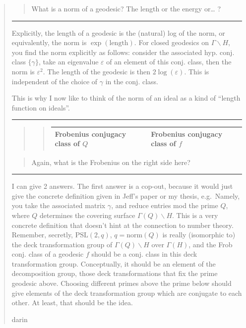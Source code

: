 \documentclass{article}
\begin{document}
\begin{quote}
\begin{quote}
What is a norm of a geodesic? The length or the energy or\ldots{} ?
\end{quote}

\begin{center}\rule{0.5\linewidth}{0.5pt}\end{center}

Explicitly, the length of a geodesic is the (natural) log of the norm,
or equivalently, the norm is \(\exp(\text{length})\). For closed
geodesics on \(\Gamma\backslash H\), you find the norm explicitly as
follows: consider the associated hyp. conj. class \(\{\gamma\}\), take
an eigenvalue \(\varepsilon\) of an element of this conj. class, then
the norm is \(\varepsilon^2\). The length of the geodesic is then
\(2\log(\varepsilon)\). This is independent of the choice of \(\gamma\)
in the conj. class.

This is why I now like to think of the norm of an ideal as a kind of
``length function on ideals''.

\begin{center}\rule{0.5\linewidth}{0.5pt}\end{center}

\begin{quote}
\begin{quote}
\begin{longtable}[]{@{}ll@{}}
\toprule
\endhead
Frobenius conjugacy class of \(Q\) & Frobenius conjugacy class of
\(f\)\tabularnewline
\bottomrule
\end{longtable}
\end{quote}
\end{quote}

\begin{quote}
Again, what is the Frobenius on the right side here?
\end{quote}

\begin{center}\rule{0.5\linewidth}{0.5pt}\end{center}

I can give 2 answers. The first answer is a cop-out, because it would
just give the concrete definition given in Jeff's paper or my thesis,
e.g.~Namely, you take the associated matrix \(\gamma\), and reduce
entries mod the prime \(Q\), where \(Q\) determines the covering surface
\(\Gamma(Q)\backslash H\). This is a very concrete definition that
doesn't hint at the connection to number theory. Remember, secretly,
\(\mathrm{PSL}(2,q)\), \(q = \mathrm{norm}(Q)\) is really (isomorphic
to) the deck transformation group of \(\Gamma(Q)\backslash H\) over
\(\Gamma(H)\), and the Frob conj. class of a geodesic \(f\) should be a
conj. class in this deck transformation group. Conceptually, it should
be an element of the decomposition group, those deck transformations
that fix the prime geodesic above. Choosing different primes above the
prime below should give elements of the deck transformation group which
are conjugate to each other. At least, that should be the idea.

darin
\end{quote}
\end{document}
